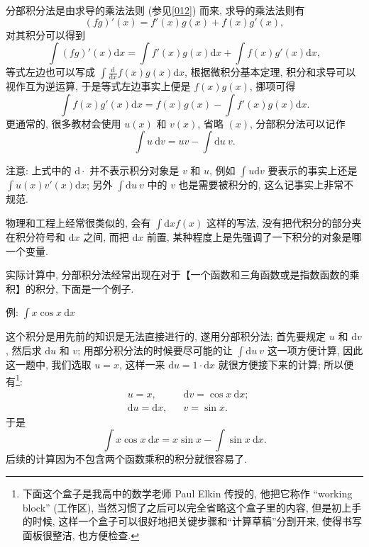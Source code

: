 \begin{tcolorbox}[size=fbox, breakable, enhanced jigsaw, title={分部积分法 (integration by parts)}]

分部积分法是由求导的乘法法则 (参见\ref{012}) 而来, 求导的乘法法则有 \[
(fg)'(x)=f'(x)g(x)+f(x)g'(x),
\] 对其积分可以得到 \[
\int(fg)'(x)\mathrm{d}x=\int f'(x)g(x)\mathrm{d}x+\int f(x)g'(x)\mathrm{d}x,
\] 等式左边也可以写成
\(\int\frac{\mathrm{d}}{\mathrm{d}x}f(x)g(x)\mathrm{d}x\),
根据微积分基本定理, 积分和求导可以视作互为逆运算, 于是等式左边事实上便是
\(f(x)g(x)\), 挪项可得 \[
\int f(x)g'(x)\mathrm{d}x=f(x)g(x)-\int f'(x)g(x)\mathrm{d}x.
\] 更通常的, 很多教材会使用 \(u(x)\) 和 \(v(x)\), 省略 \((x)\),
分部积分法可以记作 \[
\boxed{\int u\ \mathrm{d}v=uv-\int \mathrm{d}u\ v}.
\]

\begin{newquote}
注意: 上式中的 \(\mathrm{d}\cdot\) 并不表示积分对象是 \(v\) 和 \(u\),
例如 \(\int u\mathrm{d}v\) 要表示的事实上还是
\(\int u(x)v'(x)\mathrm{d}x\); 另外 \(\int \mathrm{d}u\ v\) 中的 \(v\)
也是需要被积分的, 这么记事实上非常不规范.

物理和工程上经常很类似的, 会有 \(\int\mathrm{d}x f(x)\) 这样的写法,
没有把代积分的部分夹在积分符号和 \(\mathrm{d}x\) 之间, 而把
\(\mathrm{d}x\) 前置, 某种程度上是先强调了一下积分的对象是哪一个变量.
\end{newquote}

实际计算中,
分部积分法经常出现在对于【一个函数和三角函数或是指数函数的乘积】的积分,
下面是一个例子.

\begin{newquote}
例: \(\int x\cos x\ \mathrm{d}x\)

这个积分是用先前的知识是无法直接进行的, 遂用分部积分法; 首先要规定 \(u\)
和 \(\mathrm{d}v\), 然后求 \(\mathrm{d}u\) 和 \(v\);
用部分积分法的时候要尽可能的让 \(\int \mathrm{d}u\ v\) 这一项方便计算,
因此这一题中, 我们选取 \(u=x\), 这样一来
\(\mathrm{d}u=1\cdot\mathrm{d}x\) 就很方便接下来的计算;
所以便有\footnote{下面这个盒子是我高中的数学老师 Paul Elkin 传授的,
  他把它称作 ``working block'' (工作区),
  当然习惯了之后可以完全省略这个盒子里的内容, 但是初上手的时候,
  这样一个盒子可以很好地把关键步骤和``计算草稿''分割开来,
  使得书写面板很整洁, 也方便检查.}: \[
\boxed{\begin{aligned}
&u=x,&&\mathrm{d}v=\cos x\ \mathrm{d}x;\\
&\mathrm{d}u=\mathrm{d}x,&&v=\sin x.
\end{aligned}}
\] 于是 \[
\int x\cos x\ \mathrm{d}x=x\sin x-\int\sin x\ \mathrm{d}x.
\] 后续的计算因为不包含两个函数乘积的积分就很容易了.


\end{newquote}
\end{tcolorbox}
